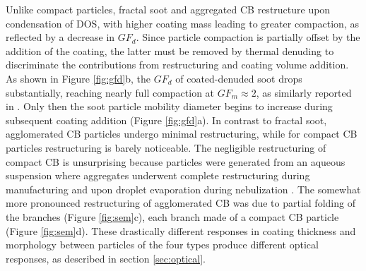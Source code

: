 Unlike compact particles, fractal soot and aggregated CB restructure upon condensation of DOS, with higher coating mass leading to greater compaction, as reflected by a decrease in $GF_d$. Since particle compaction is partially offset by the addition of the coating, the latter must be removed by thermal denuding to discriminate the contributions from restructuring and coating volume addition. As shown in Figure \ref{fig:gfd}b, the $GF_d$ of coated-denuded soot drops substantially, reaching nearly full compaction at $GF_m \approx 2$, as similarly reported in \citep{RN13}. Only then the soot particle mobility diameter begins to increase during subsequent coating addition (Figure \ref{fig:gfd}a). In contrast to fractal soot, agglomerated CB particles undergo minimal restructuring, while for compact CB particles restructuring is barely noticeable. The negligible restructuring of compact CB is unsurprising because particles were generated from an aqueous suspension where aggregates underwent complete restructuring during manufacturing and upon droplet evaporation during nebulization \citep{RN51}. The somewhat more pronounced restructuring of agglomerated CB was due to partial folding of the branches (Figure \ref{fig:sem}c), each branch made of a compact CB particle (Figure \ref{fig:sem}d). These drastically different responses in coating thickness and morphology between particles of the four types produce different optical responses, as described in section \ref{sec:optical}.
